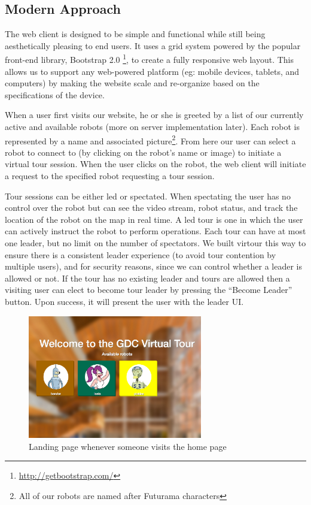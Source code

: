 \documentclass[
  oneside,
  11pt, a4paper,
  footinclude=true,
  headinclude=true,
  cleardoublepage=empty
]{article}
\begin{document}
\subsection{Modern Approach}

The web client is designed to be simple and functional while still being
aesthetically pleasing to end users. It uses a grid system powered by the
popular front-end library, Bootstrap 2.0
\footnote{\url{http://getbootstrap.com/}}, to create a fully
responsive web layout. This allows us to support any web-powered platform (eg:
mobile devices, tablets, and computers) by making the website scale and
re-organize based on the specifications of the device.

When a user first visits our website, he or she is greeted by a list of our
currently active and available robots (more on server implementation later).
Each robot is represented by a name and associated picture\footnote{All of our
robots are named after Futurama characters}. From here our user can select a
robot to connect to (by clicking on the robot's name or image) to initiate a
virtual tour session. When the user clicks on the robot, the web client will
initiate a request to the specified robot requesting a tour session.

Tour sessions can be either led or spectated. When spectating the user has no
control over the robot but can see the video stream, robot status, and track
the location of the robot on the map in real time. A led tour is one in
which the user can actively instruct the robot to perform operations. Each tour
can have at most one leader, but no limit on the number of spectators. We built
virtour this way to ensure there is a consistent leader experience (to avoid tour
contention by multiple users), and for security reasons, since we can control
whether a leader is allowed or not. If the tour has no existing leader and
tours are allowed then a visiting user can elect to become tour leader by
pressing the ``Become Leader'' button. Upon success, it will present the user
with the leader UI.

\begin{figure}
\centering
\includegraphics[width=3in]{tour_homepage}
\caption{Landing page whenever someone visits the home page}
\end{figure}
\end{document}
